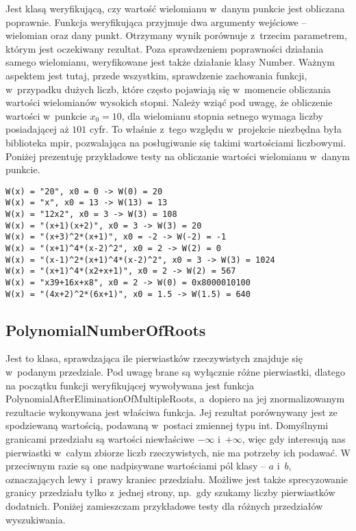 Jest klasą weryfikującą, czy wartość wielomianu w~danym punkcie jest obliczana poprawnie. Funkcja weryfikująca przyjmuje dwa argumenty wejściowe – wielomian oraz dany punkt. Otrzymany wynik porównuje z~trzecim parametrem, którym jest oczekiwany rezultat. Poza sprawdzeniem poprawności działania samego wielomianu, weryfikowane jest także działanie klasy Number. Ważnym aspektem jest tutaj, przede wszystkim, sprawdzenie zachowania funkcji, w~przypadku dużych liczb, które często pojawiają się w~momencie obliczania wartości wielomianów wysokich stopni. Należy wziąć pod uwagę, że obliczenie wartości w~punkcie $x_0=10$, dla wielomianu stopnia setnego wymaga liczby posiadającej aż $101$ cyfr. To właśnie z~tego względu w~projekcie niezbędna była biblioteka mpir, pozwalająca na posługiwanie się takimi wartościami liczbowymi. Poniżej prezentuję przykładowe testy na obliczanie wartości wielomianu w~danym punkcie.

\begin{lstlisting}
W(x) = "20", x0 = 0 -> W(0) = 20
W(x) = "x", x0 = 13 -> W(13) = 13
W(x) = "12x2", x0 = 3 -> W(3) = 108
W(x) = "(x+1)(x+2)", x0 = 3 -> W(3) = 20
W(x) = "(x+3)^2*(x+1)", x0 = -2 -> W(-2) = -1
W(x) = "(x+1)^4*(x-2)^2", x0 = 2 -> W(2) = 0
W(x) = "(x-1)^2*(x+1)^4*(x-2)^2", x0 = 3 -> W(3) = 1024
W(x) = "(x+1)^4*(x2+x+1)", x0 = 2 -> W(2) = 567
W(x) = "x39+16x+x8", x0 = 2 -> W(0) = 0x8000010100
W(x) = "(4x+2)^2*(6x+1)", x0 = 1.5 -> W(1.5) = 640
\end{lstlisting}

\subsection{PolynomialNumberOfRoots}

Jest to klasa, sprawdzająca ile pierwiastków rzeczywistych znajduje się w~podanym przedziale. Pod uwagę brane są wyłącznie różne pierwiastki, dlatego na początku funkcji weryfikującej wywoływana jest funkcja PolynomialAfterEliminationOfMultipleRoots, a~dopiero na jej znormalizowanym rezultacie wykonywana jest właściwa funkcja. Jej rezultat porównywany jest ze spodziewaną wartością, podawaną w~postaci zmiennej typu int. Domyślnymi granicami przedziału są wartości niewłaściwe $-\infty$ i~$+\infty$, więc gdy interesują nas pierwiastki w~całym zbiorze liczb rzeczywistych, nie ma potrzeby ich podawać. W przeciwnym razie są one nadpisywane wartościami pól klasy – $a$ i~$b$, oznaczających lewy i~prawy kraniec przedziału. Możliwe jest także sprecyzowanie granicy przedziału tylko z~jednej strony, np.\ gdy szukamy liczby pierwiastków dodatnich. Poniżej zamieszczam przykładowe testy dla różnych przedziałów wyszukiwania.

